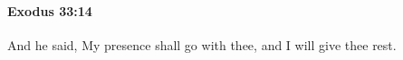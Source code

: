 
		\paragraph{Exodus 33:14} %
			\label{EXODUS-33-14}

			And he said, My presence shall go with thee, and I will give thee rest.



